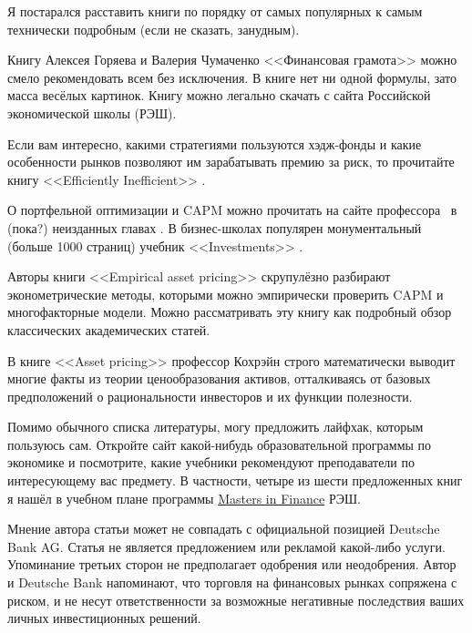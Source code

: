Я постарался расставить книги по порядку от самых популярных к самым технически 
подробным (если не сказать, занудным).

Книгу Алексея Горяева и Валерия Чумаченко <<Финансовая грамота>> 
\cite{goryaev2009} можно смело рекомендовать всем без исключения. В книге нет 
ни одной формулы, зато масса весёлых картинок. Книгу можно легально скачать с 
сайта Российской экономической школы (РЭШ).

Если вам интересно, какими стратегиями пользуются хэдж-фонды и какие 
особенности рынков позволяют им зарабатывать премию за риск, то прочитайте 
книгу <<Efficiently Inefficient>> \cite{pedersen2015efficiently}.

О портфельной оптимизации и CAPM можно прочитать на сайте профессора \ в (пока?) неизданных главах  
\cite{welch}. В бизнес-школах популярен монументальный (больше 1000 страниц) 
учебник <<Investments>> \cite{bodie2014investments}.

Авторы книги <<Empirical asset pricing>> \cite{bali2016empirical} скрупулёзно 
разбирают эконометрические методы, которыми можно эмпирически проверить CAPM и 
многофакторные модели. Можно рассматривать эту книгу как подробный обзор 
классических академических статей.

В книге <<Asset pricing>> \cite{cochrane2005asset} профессор Кохрэйн строго 
математически выводит многие факты из теории ценообразования активов, 
отталкиваясь от базовых предположений о рациональности инвесторов и их 
функции полезности.

Помимо обычного списка литературы, могу предложить лайфхак, которым пользуюсь 
сам. Откройте сайт какой-нибудь образовательной программы по экономике и 
посмотрите, какие учебники рекомендуют преподаватели по интересующему вас 
предмету. В частности, четыре из шести предложенных книг я нашёл в учебном 
плане программы \href{https://www.nes.ru/MiF-uchplan?lang=ru}{Masters in 
Finance} РЭШ.

\clearpage
{}

Мнение автора статьи может не совпадать с официальной позицией Deutsche Bank 
AG. Статья не является предложением или рекламой какой-либо услуги. Упоминание
третьих сторон не предполагает одобрения или неодобрения. Автор и Deutsche Bank
напоминают, что торговля на финансовых рынках сопряжена с риском, и не несут
ответственности за возможные негативные последствия ваших личных инвестиционных
решений.

\clearpage
{}
\en{
\printbibliography[heading = none]
}

\clearpage
\printendnotes

